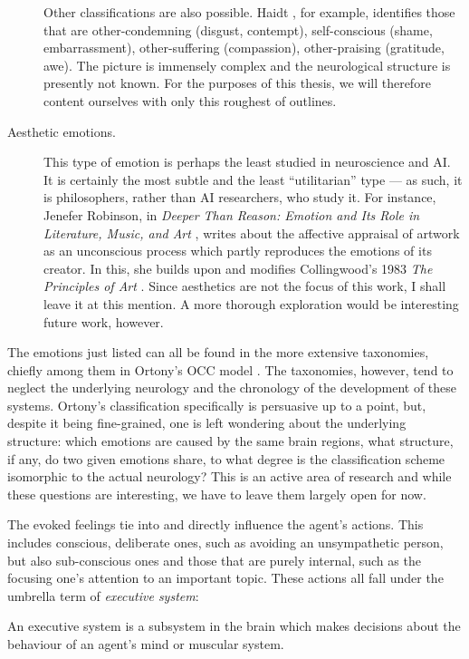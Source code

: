 \begin{description}
	Other classifications are also possible. Haidt \cite{haidt2003}, for example, identifies those that are other-condemning (disgust, contempt), self-conscious (shame, embarrassment), other-suffering (compassion), other-praising (gratitude, awe). The picture is immensely complex and the neurological structure is presently not known. For the purposes of this thesis, we will therefore content ourselves with only this roughest of outlines.
	
	\item[Aesthetic emotions.] This type of emotion is perhaps the least studied in neuroscience and AI. It is certainly the most subtle and the least ``utilitarian'' type --- as such, it is philosophers, rather than AI researchers, who study it. For instance, Jenefer Robinson, in {\em Deeper Than Reason: Emotion and Its Role in Literature, Music, and Art} \cite{robinson2005}, writes about the affective appraisal of artwork as an unconscious process which partly reproduces the emotions of its creator. In this, she builds upon and modifies Collingwood's 1983 {\em The Principles of Art} \cite{collingwood1938, SEPcollingwood}. Since aesthetics are not the focus of this work, I shall leave it at this mention. A more thorough exploration would be interesting future work, however.
\end{description}

The emotions just listed can all be found in the more extensive taxonomies, chiefly among them in Ortony's OCC model \cite{ortony1988}. The taxonomies, however, tend to neglect the underlying neurology and the chronology of the development of these systems. Ortony's classification specifically is persuasive up to a point, but, despite it being fine-grained, one is left wondering about the underlying structure: which emotions are caused by the same brain regions, what structure, if any, do two given emotions share, to what degree is the classification scheme isomorphic to the actual neurology? This is an active area of research and while these questions are interesting, we have to leave them largely open for now.

The evoked feelings tie into and directly influence the agent's actions. This includes conscious, deliberate ones, such as avoiding an unsympathetic person, but also sub-conscious ones and those that are purely internal, such as the focusing one's attention to an important topic. These actions all fall under the umbrella term of {\em executive system}:

\begin{definition}
An executive system is a subsystem in the brain which makes decisions about the behaviour of an agent's mind or muscular system.
\end{definition}

